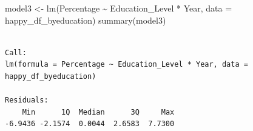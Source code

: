 \documentclass[
  11pt,
  a4paper,
  DIV=11,
  numbers=noendperiod]{scrartcl}
\newenvironment{Shaded}{\begin{snugshade}}{\end{snugshade}}
\newcommand{\AttributeTok}[1]{\textcolor[rgb]{0.40,0.45,0.13}{#1}}
\newcommand{\FunctionTok}[1]{\textcolor[rgb]{0.28,0.35,0.67}{#1}}
\newcommand{\NormalTok}[1]{\textcolor[rgb]{0.00,0.23,0.31}{#1}}
\newcommand{\OtherTok}[1]{\textcolor[rgb]{0.00,0.23,0.31}{#1}}
\newcommand{\SpecialCharTok}[1]{\textcolor[rgb]{0.37,0.37,0.37}{#1}}
\begin{document}
\begin{Shaded}
\begin{Highlighting}[]
\NormalTok{model3 }\OtherTok{\textless{}{-}} \FunctionTok{lm}\NormalTok{(Percentage }\SpecialCharTok{\textasciitilde{}}\NormalTok{ Education\_Level }\SpecialCharTok{*}\NormalTok{ Year, }\AttributeTok{data =}\NormalTok{ happy\_df\_byeducation)}
\FunctionTok{summary}\NormalTok{(model3)}
\end{Highlighting}
\end{Shaded}

\begin{verbatim}

Call:
lm(formula = Percentage ~ Education_Level * Year, data = happy_df_byeducation)

Residuals:
    Min      1Q  Median      3Q     Max 
-6.9436 -2.1574  0.0044  2.6583  7.7300 


\end{verbatim}
\end{document}

